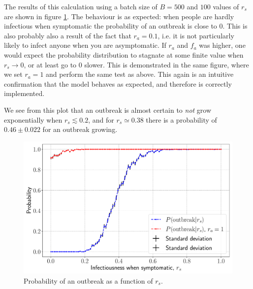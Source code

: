 The results of this calculation using a batch size of $B = 500$ and $100$ values of $r_s$ are shown in figure \ref{fig:rs_prob}. The behaviour is as expected: when people are hardly infectious when symptomatic the probability of an outbreak is close to $0$. This is also probably also a result of the fact that $r_a = 0.1$, i.e. it is not particularly likely to infect anyone when you are asymptomatic. If $r_a$ and $f_a$ was higher, one would expect the probability distribution to stagnate at some finite value when $r_s \to 0$, or at least go to $0$ slower. This is demonstrated in the same figure, where we set $r_a = 1$ and perform the same test as above. This again is an intuitive confirmation that the model behaves as expected, and therefore is correctly implemented.

We see from this plot that an outbreak is almost certain to \textit{not} grow exponentially when $r_s \lesssim 0.2$, and for $r_s \simeq 0.38$ there is a probability of $0.46 \pm 0.022$ for an outbreak growing. 

\begin{figure}[htb]
	\centering
	\includegraphics[width=0.8\columnwidth]{../fig/2Cb_probs.pdf}
	\caption{Probability of an outbreak as a function of $r_s$.}
	\label{fig:rs_prob}
\end{figure}


\clearpage